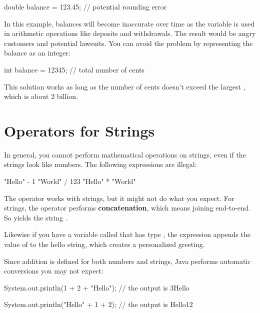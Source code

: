 \begin{code}
double balance = 123.45;  // potential rounding error
\end{code}

In this example, balances will become inaccurate over time as the variable is used in arithmetic operations like deposits and withdrawals.
The result would be angry customers and potential lawsuits.
You can avoid the problem by representing the balance as an integer:

\begin{code}
int balance = 12345;      // total number of cents
\end{code}


This solution works as long as the number of cents doesn't exceed the largest , which is about 2 billion.


\section{Operators for Strings}


In general, you cannot perform mathematical operations on strings, even if the strings look like numbers.
The following expressions are illegal:

\begin{code}
"Hello" - 1     "World" / 123     "Hello" * "World"
\end{code}


The \java{+} operator works with strings, but it might not do what you expect.
For strings, the \java{+} operator performs {\bf concatenation}, which means joining end-to-end.
So  yields the string .

Likewise if you have a variable called  that has type , the expression  appends the value of  to the hello string, which creates a personalized greeting.

Since addition is defined for both numbers and strings, Java performs automatic conversions you may not expect:

\begin{code}
System.out.println(1 + 2 + "Hello");
// the output is 3Hello

System.out.println("Hello" + 1 + 2);
// the output is Hello12
\end{code}

